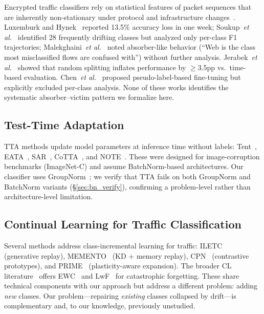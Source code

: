\documentclass[journal]{IEEEtran}
\makeatletter
\newcommand{\etal}{\textit{et al.}\@}
\makeatother
\begin{document}
Encrypted traffic classifiers rely on statistical features of packet sequences that are inherently non-stationary under protocol and infrastructure changes~\cite{luxemburk2023quic, rezaei2019deep, soukup2025drift, malekghaini2023drift}.
Luxemburk and Hynek~\cite{luxemburk2023quic} reported 13.5\% accuracy loss in one week; Soukup~\etal{}~\cite{soukup2025drift} identified 28 frequently drifting classes but analyzed only per-class F1 trajectories; Malekghaini~\etal{}~\cite{malekghaini2023drift} noted absorber-like behavior (``Web is the class most misclassified flows are confused with'') without further analysis.
Jerabek~\etal{}~\cite{jerabek2025eval} showed that random splitting inflates performance by $\geq$3.5pp vs.\ time-based evaluation.
Chen~\etal{}~\cite{chen2025selfevolving} proposed pseudo-label-based fine-tuning but explicitly excluded per-class analysis.
None of these works identifies the systematic absorber--victim pattern we formalize here.

\subsection{Test-Time Adaptation}

TTA methods update model parameters at inference time without labels: Tent~\cite{wang2021tent}, EATA~\cite{niu2022eata}, SAR~\cite{niu2023sar}, CoTTA~\cite{wang2022cotta}, and NOTE~\cite{gong2022note}.
These were designed for image-corruption benchmarks (ImageNet-C) and assume BatchNorm-based architectures.
Our classifier uses GroupNorm~\cite{wu2018groupnorm}; we verify that TTA fails on both GroupNorm and BatchNorm variants (\S\ref{sec:bn_verify}), confirming a problem-level rather than architecture-level limitation.

\subsection{Continual Learning for Traffic Classification}

Several methods address class-incremental learning for traffic: ILETC~\cite{zhu2023iletc} (generative replay), MEMENTO~\cite{cerasuolo2024memento} (KD + memory replay), CPN~\cite{cai2024cpn} (contrastive prototypes), and PRIME~\cite{prime2025} (plasticity-aware expansion). The broader CL literature~\cite{delange2022continual} offers EWC~\cite{kirkpatrick2017ewc} and LwF~\cite{li2018lwf} for catastrophic forgetting.
These share technical components with our approach but address a different problem: adding \textit{new} classes. Our problem---repairing \textit{existing} classes collapsed by drift---is complementary and, to our knowledge, previously unstudied.
\end{document}
